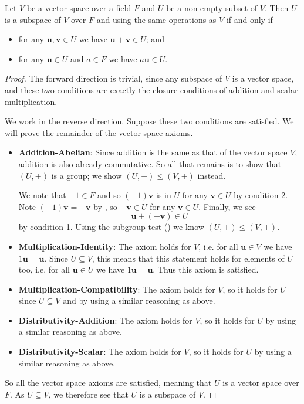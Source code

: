 \begin{theorem}\label{thrm-subspace-test}
    Let $V$ be a vector space over a field $F$ and $U$ be a non-empty subset of $V$. Then $U$ is a subspace of $V$ over $F$ and using the same operations as $V$ if and only if
    \begin{itemize}
        \item for any $\textbf{u}, \textbf{v} \in U$ we have $\textbf{u} + \textbf{v} \in U$; and
        \item for any $\textbf{u} \in U$ and $a \in F$ we have $a\textbf{u} \in U$.
    \end{itemize}
\end{theorem}
\begin{proof}
    The forward direction is trivial, since any subspace of $V$ is a vector space, and these two conditions are exactly the closure conditions of addition and scalar multiplication.

    We work in the reverse direction. Suppose these two conditions are satisfied. We will prove the remainder of the vector space axioms.
    \begin{itemize}
        \item \textbf{Addition-Abelian}: Since addition is the same as that of the vector space $V$, addition is also already commutative. So all that remains is to show that $(U, +)$ is a group; we show $(U, +) \leq (V, +)$ instead.
        
        We note that $-1 \in F$ and so $(-1)\textbf{v}$ is in $U$ for any $\textbf{v} \in U$ by condition 2. Note $(-1)\textbf{v} = -\textbf{v}$ by , so $-\textbf{v} \in U$ for any $\textbf{v} \in U$. Finally, we see
        \[
            \textbf{u} + (-\textbf{v}) \in U
        \]
        by condition 1. Using the subgroup test () we know $(U, +) \leq (V, +)$.
        
        \item \textbf{Multiplication-Identity}: The axiom holds for $V$, i.e. for all $\textbf{u} \in V$ we have $1\textbf{u} = \textbf{u}$. Since $U \subseteq V$, this means that this statement holds for elements of $U$ too, i.e. for all $\textbf{u} \in U$ we have $1\textbf{u} = \textbf{u}$. Thus this axiom is satisfied.
        
        \item \textbf{Multiplication-Compatibility}: The axiom holds for $V$, so it holds for $U$ since $U \subseteq V$ and by using a similar reasoning as above.
        
        \item \textbf{Distributivity-Addition}: The axiom holds for $V$, so it holds for $U$ by using a similar reasoning as above.
        
        \item \textbf{Distributivity-Scalar}: The axiom holds for $V$, so it holds for $U$ by using a similar reasoning as above.
    \end{itemize}
    So all the vector space axioms are satisfied, meaning that $U$ is a vector space over $F$. As $U \subseteq V$, we therefore see that $U$ is a subspace of $V$.
\end{proof}
